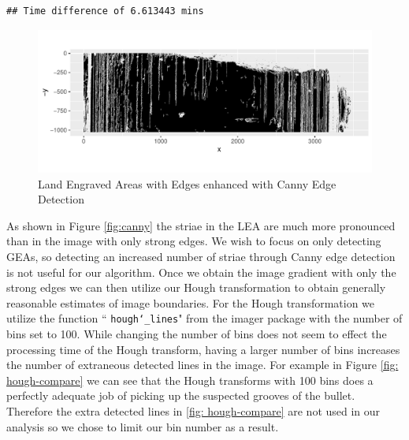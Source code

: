 \documentclass[12pt]{article}\usepackage[]{graphicx}\usepackage[]{color}
\makeatletter
\def\maxwidth{ %
  \ifdim\Gin@nat@width>\linewidth
    \linewidth
  \else
    \Gin@nat@width
  \fi
}
\newenvironment{kframe}{%
 \def\at@end@of@kframe{}%
 \ifinner\ifhmode%
  \def\at@end@of@kframe{\end{minipage}}%
  \begin{minipage}{\columnwidth}%
 \fi\fi%
 \def\FrameCommand##1{\hskip\@totalleftmargin \hskip-\fboxsep
 \colorbox{shadecolor}{##1}\hskip-\fboxsep
     \hskip-\linewidth \hskip-\@totalleftmargin \hskip\columnwidth}%
 \MakeFramed {\advance\hsize-\width
   \@totalleftmargin\z@ \linewidth\hsize
   \@setminipage}}%
 {\par\unskip\endMakeFramed%
 \at@end@of@kframe}
\newenvironment{knitrout}{}{} %
\theoremstyle{nonumberplain}
\makeatother
\begin{document}
\begin{knitrout}
\color{fgcolor}\begin{kframe}
\begin{verbatim}
## Time difference of 6.613443 mins
\end{verbatim}
\end{kframe}\begin{figure}

{\centering \includegraphics[width=\maxwidth]{figure/r_canny-edge-1} 

}

\caption[Land Engraved Areas with Edges enhanced with Canny Edge Detection]{Land Engraved Areas with Edges enhanced with Canny Edge Detection}\label{fig:r canny-edge}
\end{figure}


\end{knitrout}

As shown in Figure \ref{fig:canny} the striae in the LEA are much more pronounced than in the image with only strong edges. We wish to focus on only detecting GEAs, so detecting an increased number of striae through Canny edge detection is not useful for our algorithm. Once we obtain the image gradient with only the strong edges we can then utilize our Hough transformation to obtain generally reasonable estimates of image boundaries. For the Hough transformation we utilize the function `` \texttt{hough\char`_lines}" from the imager package with the number of bins set to 100. While changing the number of bins does not seem to effect the processing time of the Hough transform, having a larger number of bins increases the number of extraneous detected lines in the image. For example in Figure \ref{fig: hough-compare} we can see that the Hough transforms with 100 bins does a perfectly adequate job of picking up the suspected grooves of the bullet. Therefore the extra detected lines in \ref{fig: hough-compare} are not used in our analysis so we chose to limit our bin number as a result.
\end{document}
